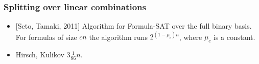 \begin{frame}
    \frametitle{Splitting over linear combinations}

	\begin{itemize}
		\item{} [Seto, Tamaki, 2011] Algorithm for Formula-SAT over the full binary
		    basis. For formulas of size $cn$ the algorithm runs $2^{(1 - \mu_c)n}$,
            where $\mu_c$ is a constant.
        \pause
		\item{} Hirsch, Kulikov $3 \frac{1}{86}n$.
	\end{itemize}    
\end{frame}